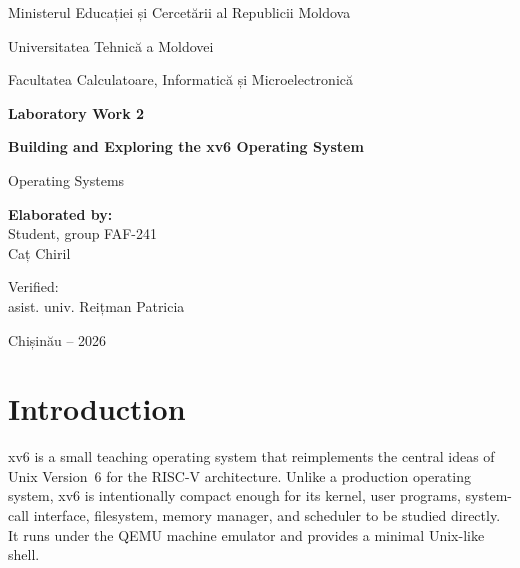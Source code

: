 \documentclass[12pt]{article}
\begin{document}

\begin{titlepage}
    \centering

    {\large Ministerul Educației și Cercetării al Republicii Moldova\par}
    \vspace{0.45cm}
    {\large Universitatea Tehnică a Moldovei\par}
    \vspace{0.45cm}
    {\large Facultatea Calculatoare, Informatică și Microelectronică\par}

    \vspace{3cm}

    {\Large\bfseries Laboratory Work 2\par}
    \vspace{0.55cm}
    {\LARGE\bfseries Building and Exploring the xv6 Operating System\par}
    \vspace{0.35cm}
    {\large Operating Systems\par}

    \vfill

    \begin{flushleft}
        \textbf{Elaborated by:}\\
        Student, group FAF-241\\
        Caț Chiril

        \vspace{1cm}

        Verified:\\
        asist. univ. Reițman Patricia
    \end{flushleft}

    \vfill

    {Chișinău -- 2026\par}
\end{titlepage}

\tableofcontents
\clearpage
{}

\section{Introduction}

xv6 is a small teaching operating system that reimplements the central ideas of Unix Version~6 for the RISC-V architecture. Unlike a production operating system, xv6 is intentionally compact enough for its kernel, user programs, system-call interface, filesystem, memory manager, and scheduler to be studied directly. It runs under the QEMU machine emulator and provides a minimal Unix-like shell.
\end{document}
